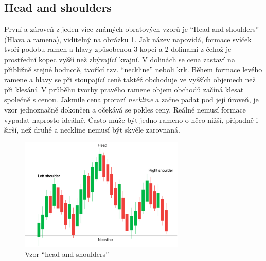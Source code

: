 \subsection{Head and shoulders}
První a zároveň z jeden více známých obratových vzorů je \enquote{Head and shoulders} (Hlava a ramena), viditelný na obrázku \ref{fig:head-n-shoulders}. Jak název napovídá, formace svíček tvoří podobu ramen a hlavy způsobenou
3 kopci a 2 dolinami z čehož je prostřední kopec vyšší než zbývající krajní. V dolinách se cena zastaví na přibližně stejné hodnotě, tvořící tzv. \enquote{neckline} neboli krk.
Během formace levého ramene a hlavy se při stoupající ceně taktéž obchoduje ve vyšších objemech než při klesání. V průběhu tvorby pravého ramene objem obchodů začíná klesat společně s cenou.
Jakmile cena prorazí \emph{neckline} a začne padat pod její úroveň, je vzor jednoznačně dokončen a očekává se pokles ceny. Reálně nemusí formace vypadat naprosto ideálně. Často
může být jedno rameno o něco nižší, případně i širší, než druhé a neckline nemusí být skvěle zarovnaná.

\begin{figure}[ht]
    \centering
    \includegraphics[width=0.7\textwidth]{Figures/Head-n-shoulders.pdf}
    \caption{Vzor \enquote{head and shoulders}}
    \label{fig:head-n-shoulders}
\end{figure}


